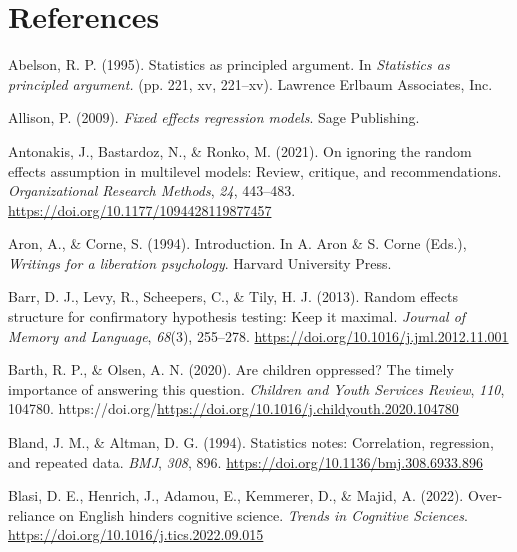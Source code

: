 \documentclass[
  letterpaper,
  DIV=11,
  numbers=noendperiod]{scrreprt}
\newlength{\cslhangindent}
\newlength{\cslentryspacingunit} %
\newenvironment{CSLReferences}[2] %
 {%
  \setlength{\parindent}{0pt}
  \ifodd #1
  \let\oldpar\par
  \def\par{\hangindent=\cslhangindent\oldpar}
  \fi
  \setlength{\parskip}{#2\cslentryspacingunit}
 }%
 {}
\begin{document}
\hypertarget{references}{%
\chapter*{References}\label{references}}


\hypertarget{refs}{}
\begin{CSLReferences}{1}{0}
\leavevmode{}%
Abelson, R. P. (1995). Statistics as principled argument. In
\emph{Statistics as principled argument.} (pp. 221, xv, 221--xv).
Lawrence Erlbaum Associates, Inc.

\leavevmode{}%
Allison, P. (2009). \emph{Fixed effects regression models}. Sage
Publishing.

\leavevmode{}%
Antonakis, J., Bastardoz, N., \& Ronko, M. (2021). On ignoring the
random effects assumption in multilevel models: Review, critique, and
recommendations. \emph{Organizational Research Methods}, \emph{24},
443--483. \url{https://doi.org/10.1177/1094428119877457}

\leavevmode{}%
Aron, A., \& Corne, S. (1994). Introduction. In A. Aron \& S. Corne
(Eds.), \emph{Writings for a liberation psychology}. Harvard University
Press.

\leavevmode{}%
Barr, D. J., Levy, R., Scheepers, C., \& Tily, H. J. (2013). Random
effects structure for confirmatory hypothesis testing: Keep it maximal.
\emph{Journal of Memory and Language}, \emph{68}(3), 255--278.
\url{https://doi.org/10.1016/j.jml.2012.11.001}

\leavevmode{}%
Barth, R. P., \& Olsen, A. N. (2020). Are children oppressed? The timely
importance of answering this question. \emph{Children and Youth Services
Review}, \emph{110}, 104780.
https://doi.org/\url{https://doi.org/10.1016/j.childyouth.2020.104780}

\leavevmode{}%
Bland, J. M., \& Altman, D. G. (1994). Statistics notes: Correlation,
regression, and repeated data. \emph{BMJ}, \emph{308}, 896.
\url{https://doi.org/10.1136/bmj.308.6933.896}

\leavevmode{}%
Blasi, D. E., Henrich, J., Adamou, E., Kemmerer, D., \& Majid, A.
(2022). Over-reliance on {E}nglish hinders cognitive science.
\emph{Trends in Cognitive Sciences}.
\url{https://doi.org/10.1016/j.tics.2022.09.015}


\end{CSLReferences}
\end{document}
